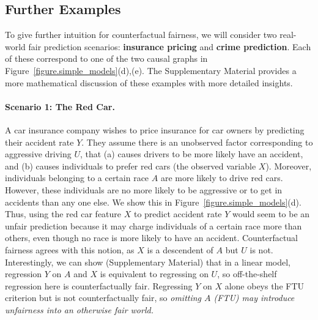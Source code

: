 \subsection{Further Examples}
\label{sec:further_examples}

To give further intuition for counterfactual fairness, we will consider
two real-world fair prediction scenarios: \textbf{insurance pricing}
and \textbf{crime prediction}. Each of these correspond to one of the
two causal graphs in Figure~\ref{figure.simple_models}(d),(e). The
Supplementary Material provides a more mathematical discussion of
these examples with more detailed insights.

\paragraph{Scenario 1: The Red Car.}
A car insurance company wishes to price insurance for car
owners by predicting their accident rate $Y$. They assume there is an
unobserved factor corresponding to aggressive driving $U$, that (a)
causes drivers to be more likely have an accident, and (b) causes
individuals to prefer red cars (the observed variable $X$). Moreover,
individuals belonging to a certain race $A$ are more likely to drive
red cars. However, these individuals are no more likely to be
aggressive or to get in accidents than any one else. We show this in
Figure~\ref{figure.simple_models}(d). Thus, using the
red car feature $X$ to predict accident rate $Y$ would seem to be an
unfair prediction because it may charge individuals of a certain race
more than others, even though no race is more likely to have an
accident. Counterfactual fairness agrees with this notion, as $X$
is a descendent of $A$ but $U$ is not. Interestingly, we can show
(Supplementary Material) that in a linear model, regression $Y$ on $A$
and $X$ is equivalent to regressing on $U$, so off-the-shelf
regression here is counterfactually fair. Regressing $Y$ on $X$ alone
obeys the FTU criterion but is not counterfactually fair, so
{\em omitting $A$ (FTU) may introduce unfairness into
  an otherwise fair world.}
%

